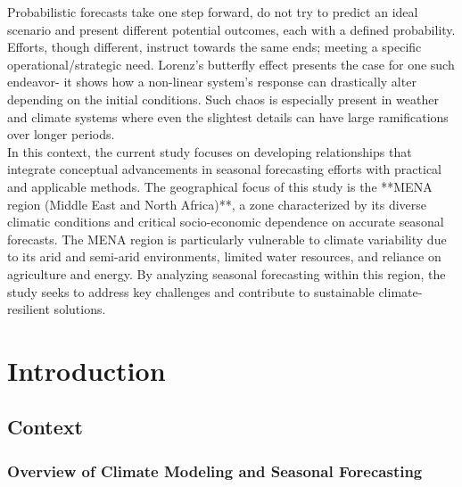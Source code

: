 Probabilistic forecasts take one step forward, do not try to predict an ideal scenario and present different potential outcomes, each with a defined probability. Efforts, though different, instruct towards the same ends; meeting a specific operational/strategic need. Lorenz’s butterfly effect presents the case for one such endeavor- it shows how a non-linear system’s response can drastically alter depending on the initial conditions. Such chaos is especially present in weather and climate systems where even the slightest details can have large ramifications over longer periods.\\

In this context, the current study focuses on developing relationships that integrate conceptual advancements in seasonal forecasting efforts with practical and applicable methods. The geographical focus of this study is the **MENA region (Middle East and North Africa)**, a zone characterized by its diverse climatic conditions and critical socio-economic dependence on accurate seasonal forecasts. The MENA region is particularly vulnerable to climate variability due to its arid and semi-arid environments, limited water resources, and reliance on agriculture and energy. By analyzing seasonal forecasting within this region, the study seeks to address key challenges and contribute to sustainable climate-resilient solutions.\\




\chapter{Introduction}
\section{Context}
\subsection{Overview of Climate Modeling and Seasonal Forecasting}

